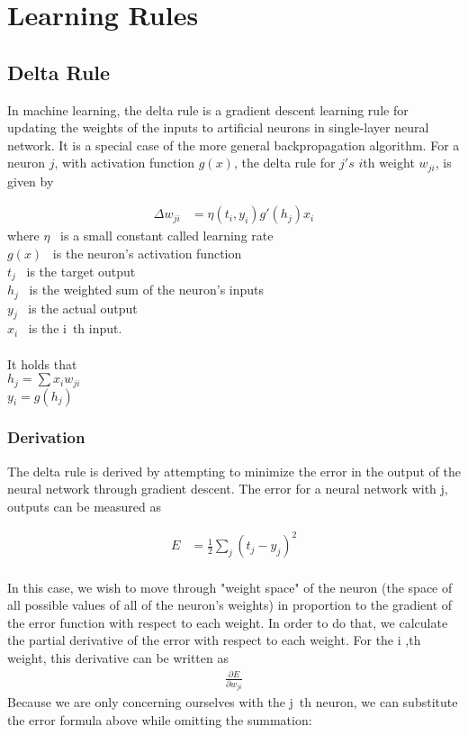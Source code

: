 \chapter{Learning Rules}

\section{Delta Rule}
In machine learning, the delta rule is a gradient descent learning rule for updating the weights of the inputs to artificial neurons in single-layer neural network. It is a special case of the more general backpropagation algorithm. For a neuron $j$, with activation function $g(x)$, the delta rule for $j's$ $i$th weight $w_{ji}$, is given by

\begin{align*}
\Delta w_{ji} &= \eta (t_i, y_i) g'(h_j)x_i
\end{align*}
where
$\eta$ \, is a small constant called learning rate \\
$g(x)$ \, is the neuron's activation function \\
$t_j$ \, is the target output \\
$h_j$ \, is the weighted sum of the neuron's inputs \\
$y_j$ \, is the actual output \\
$x_i$ \, is the i \,th input. \\
\\


It holds that \\
$h_j = \sum x_i w_{ji}$ \\
$y_i = g(h_j)$

\subsection{Derivation}

The delta rule is derived by attempting to minimize the error in the output of the neural network through gradient descent. The error for a neural network with j, outputs can be measured as

\begin{align*}
E &= \frac{1}{2} \sum_j (t_j - y_j)^2
\end{align*}
\\
In this case, we wish to move through "weight space" of the neuron (the space of all possible values of all of the neuron's weights) in proportion to the gradient of the error function with respect to each weight. In order to do that, we calculate the partial derivative of the error with respect to each weight. For the i ,th weight, this derivative can be written as
\begin{align*}
\frac{\partial E}{ \partial w_{ji} }
\end{align*}
Because we are only concerning ourselves with the j \,th neuron, we can substitute the error formula above while omitting the summation:

